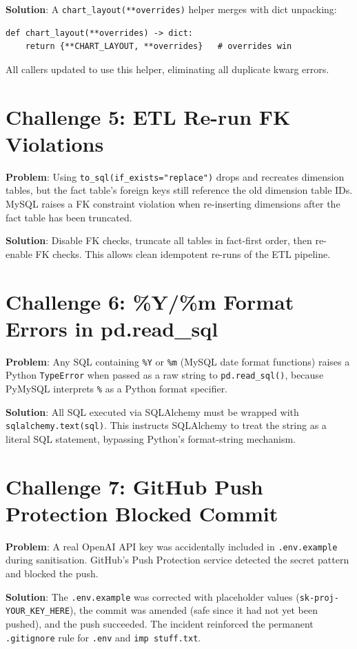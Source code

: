 \documentclass[12pt,a4paper]{report}
\begin{document}
\textbf{Solution}: A \texttt{chart\_layout(**overrides)} helper merges with dict unpacking:
\begin{lstlisting}
def chart_layout(**overrides) -> dict:
    return {**CHART_LAYOUT, **overrides}   # overrides win
\end{lstlisting}
All callers updated to use this helper, eliminating all duplicate kwarg errors.

\section{Challenge 5: ETL Re-run FK Violations}

\textbf{Problem}: Using \texttt{to\_sql(if\_exists="replace")} drops and recreates dimension
tables, but the fact table's foreign keys still reference the old dimension table IDs. MySQL
raises a FK constraint violation when re-inserting dimensions after the fact table has been
truncated.

\textbf{Solution}: Disable FK checks, truncate all tables in fact-first order, then re-enable
FK checks. This allows clean idempotent re-runs of the ETL pipeline.

\section{Challenge 6: \%Y/\%m Format Errors in pd.read\_sql}

\textbf{Problem}: Any SQL containing \texttt{\%Y} or \texttt{\%m} (MySQL date format
functions) raises a Python \texttt{TypeError} when passed as a raw string to
\texttt{pd.read\_sql()}, because PyMySQL interprets \texttt{\%} as a Python format specifier.

\textbf{Solution}: All SQL executed via SQLAlchemy must be wrapped with
\texttt{sqlalchemy.text(sql)}. This instructs SQLAlchemy to treat the string as a literal
SQL statement, bypassing Python's format-string mechanism.

\section{Challenge 7: GitHub Push Protection Blocked Commit}

\textbf{Problem}: A real OpenAI API key was accidentally included in \texttt{.env.example}
during sanitisation. GitHub's Push Protection service detected the secret pattern and blocked
the push.

\textbf{Solution}: The \texttt{.env.example} was corrected with placeholder values
(\texttt{sk-proj-YOUR\_KEY\_HERE}), the commit was amended (safe since it had not yet been
pushed), and the push succeeded. The incident reinforced the permanent \texttt{.gitignore}
rule for \texttt{.env} and \texttt{imp stuff.txt}.
\end{document}
